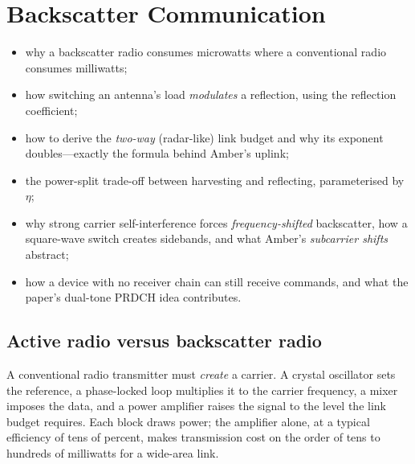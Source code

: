 \chapter{Backscatter Communication}
\label{ch:backscatter}

\begin{defbox}
\begin{itemize}
 \item why a backscatter radio consumes microwatts where a conventional radio consumes milliwatts;
 \item how switching an antenna's load \emph{modulates} a reflection, using the reflection coefficient;
 \item how to derive the \emph{two-way} (radar-like) link budget and why its exponent doubles---exactly the formula behind Amber's uplink;
 \item the power-split trade-off between harvesting and reflecting, parameterised by $\eta$;
 \item why strong carrier self-interference forces \emph{frequency-shifted} backscatter, how a square-wave switch creates sidebands, and what Amber's \emph{subcarrier shifts} abstract;
 \item how a device with no receiver chain can still receive commands, and what the paper's dual-tone PRDCH idea contributes.
\end{itemize}
\end{defbox}

\section{Active radio versus backscatter radio}
\label{sec:activevsbs}

A conventional radio transmitter must \emph{create} a carrier. A crystal oscillator
sets the reference, a phase-locked loop multiplies it to the carrier
frequency, a mixer imposes the data, and a power amplifier raises the signal to
the level the link budget requires. Each block draws power; the amplifier alone,
at a typical efficiency of tens of percent, makes transmission cost on the order of
tens to hundreds of milliwatts for a wide-area link.

